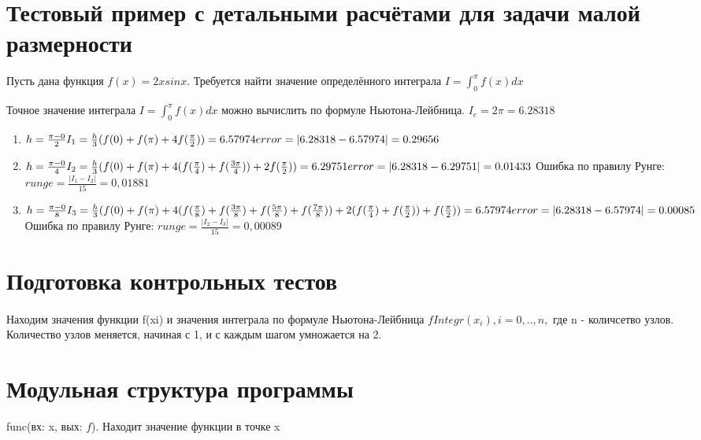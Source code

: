 \documentclass{article}
\begin{document}
	\section{Тестовый пример с детальными расчётами для задачи малой размерности}
	Пусть дана функция $f(x) = 2xsinx$. Требуется найти значение определённого интеграла $I = \int_0^\pi f(x)dx$ 
	
	Точное значение интеграла $I = \int_0^\pi f(x)dx$ можно вычислить по формуле Ньютона-Лейбница. $I_e = 2\pi = 6.28318$
	
	\begin{enumerate}
		\item $h = \frac{\pi - 0}{2}\\
		I_1 = \frac{h}{3}(f(0)+f(\pi)+4f(\frac{\pi}{2})) = 6.57974\\
		error = |6.28318 - 6.57974| = 0.29656$ \\
		\item $h = \frac{\pi - 0}{4}\\
		I_2 = \frac{h}{3}(f(0)+f(\pi)+4(f(\frac{\pi}{4}) + f(\frac{3\pi}{4}))+ 2f(\frac{\pi}{2})) = 6.29751\\
		error = |6.28318 - 6.29751| =  0.01433\\$ 
		Ошибка по правилу Рунге:
		$runge = \frac{|I_1- I_2|}{15} = 0,01881$
		\item $h = \frac{\pi - 0}{8}\\
		I_3 = \frac{h}{3}(f(0)+f(\pi)+4(f(\frac{\pi}{8}) + f(\frac{3\pi}{8}) + f(\frac{5\pi}{8}) + f(\frac{7\pi}{8}))+ 2(f(\frac{\pi}{4})+ f(\frac{\pi}{2})) + f(\frac{\pi}{2})) = 6.57974\\
		error = |6.28318 - 6.57974| =  0.00085\\$
		Ошибка по правилу Рунге:
		$runge = \frac{|I_2- I_3|}{15} = 0,00089$
	\end{enumerate}
	
	\section{Подготовка контрольных тестов}
	\paragraph{}Находим значения функции f(xi) и значения интеграла по
	формуле Ньютона-Лейбница $fIntegr(x_i), i = 0, .., n,$ где n - количсетво узлов. Количество узлов меняется, начиная с 1, и
	с каждым шагом умножается на 2.
	
	\section{Модульная структура программы}
	func(вх: x, вых: $f$). Находит значение функции в точке x
	
\end{document}
